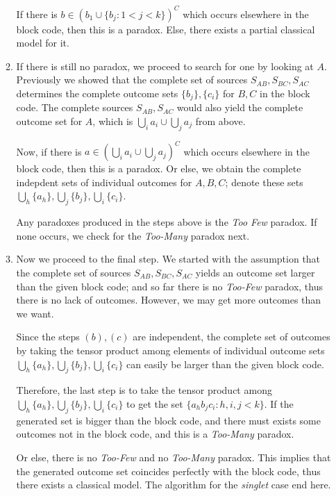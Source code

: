 \documentclass[12pt]{article}  %
\begin{document}
\begin{enumerate}
\begin{enumerate}
If there is $b \in (b_1 \cup \{b_j : 1<j<k\})^C$ which occurs elsewhere in the block code, then this is a paradox. Else, there exists a partial classical model for it.


\item If there is still no paradox, we proceed to search for one by looking at $A$. Previously we showed that the complete set of sources $S_{AB},S_{BC},S_{AC}$ determines the complete outcome sets $\{b_j\},\{c_i\}$ for $B,C$ in the block code. The complete sources $S_{AB}, S_{AC}$ would also yield the complete outcome set for $A$, which is $\bigcup\limits_{i}a_i \cup \bigcup\limits_{j}a_j$ from above.


Now, if there is $a \in (\bigcup\limits_{i}a_i \cup \bigcup\limits_{j}a_j)^C$ which occurs elsewhere in the block code, then this is a paradox. Or else, we obtain the complete indepdent sets of individual outcomes for $A,B,C$; denote these sets $\bigcup\limits_{h}\{a_h\},\bigcup\limits_{j}\{b_j\},\bigcup\limits_{i}\{c_i\}$.


Any paradoxes produced in the steps above is the \textit{Too Few} paradox. If none occurs, we check for the \textit{Too-Many} paradox next.


\item Now we proceed to the final step. We started with the assumption that the complete set of sources $S_{AB},S_{BC},S_{AC}$ yields an outcome set larger than the given block code; and so far there is no \textit{Too-Few} paradox, thus there is no lack of outcomes. However, we may get more outcomes than we want. 


Since the steps $(b),(c)$ are independent, the complete set of outcomes by taking the tensor product among elements of individual outcome sets $\bigcup\limits_{h}\{a_h\},\bigcup\limits_{j}\{b_j\},\bigcup\limits_{i}\{c_i\}$ can easily be larger than the given block code. 


Therefore, the last step is to take the tensor product among $\bigcup\limits_{h}\{a_h\},\bigcup\limits_{j}\{b_j\},\bigcup\limits_{i}\{c_i\}$ to get the set $\{ a_h b_j c_i : h, i, j <k \}$. If the generated set is bigger than the block code, and there must exists some outcomes not in the block code, and this is a \textit{Too-Many} paradox.


Or else, there is no \textit{Too-Few} and no \textit{Too-Many} paradox. This implies that the generated outcome set coincides perfectly with the block code, thus there exists a classical model. The algorithm for the \textit{singlet} case end here.


\end{enumerate}
\end{enumerate}
\end{document}
